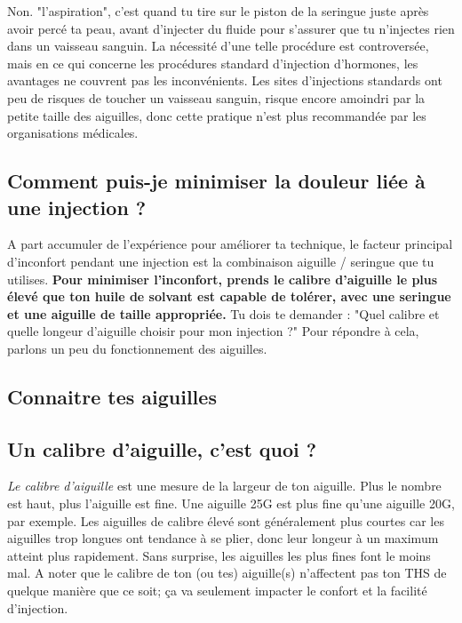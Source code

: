 \documentclass{article}
\begin{document}
Non. "l'aspiration", c'est quand tu tire sur le piston de la seringue juste après avoir percé ta peau, avant d'injecter du fluide pour s'assurer que tu n'injectes rien dans un vaisseau sanguin. La nécessité d'une telle procédure est controversée, mais en ce qui concerne les procédures standard d'injection d'hormones, les avantages ne couvrent pas les inconvénients. Les sites d'injections standards ont peu de risques de toucher un vaisseau sanguin, risque encore amoindri par la petite taille des aiguilles, donc cette pratique n'est plus recommandée par les organisations médicales.

\subsection{Comment puis-je minimiser la douleur liée à une injection ?}

A part accumuler de l'expérience pour améliorer ta technique, le facteur principal d'inconfort pendant une injection est la combinaison aiguille / seringue que tu utilises. \textbf{Pour minimiser l'inconfort, prends le calibre d'aiguille le plus élevé que ton huile de solvant est capable de tolérer, avec une seringue et une aiguille de taille appropriée.} Tu dois te demander : "Quel calibre et quelle longeur d'aiguille choisir pour mon injection ?" Pour répondre à cela, parlons un peu du fonctionnement des aiguilles.

\subsection*{Connaitre tes aiguilles}

\subsection{Un calibre d'aiguille, c'est quoi ?}

\textit{Le calibre d'aiguille} est une mesure de la largeur de ton aiguille. Plus le nombre est haut, plus l'aiguille est fine. Une aiguille 25G est plus fine qu'une aiguille 20G, par exemple. Les aiguilles de calibre élevé sont généralement plus courtes car les aiguilles trop longues ont tendance à se plier, donc leur longeur à un maximum atteint plus rapidement. Sans surprise, les aiguilles les plus fines font le moins mal. A noter que le calibre de ton (ou tes) aiguille(s) n'affectent pas ton THS de quelque manière que ce soit; ça va seulement impacter le confort et la facilité d'injection.
\end{document}
